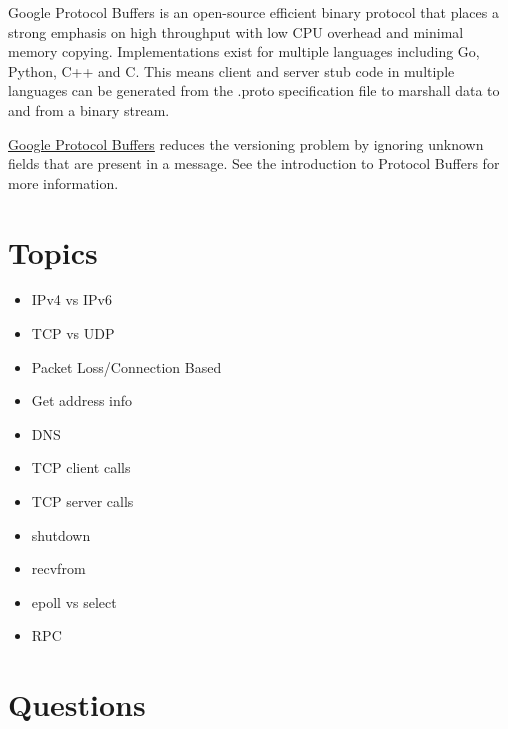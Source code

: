 Google Protocol Buffers is an open-source efficient binary protocol that
places a strong emphasis on high throughput with low CPU overhead and
minimal memory copying. Implementations exist for multiple languages
including Go, Python, C++ and C. This means client and server stub code
in multiple languages can be generated from the .proto specification
file to marshall data to and from a binary stream.

\href{https://developers.google.com/protocol-buffers/docs/overview}{Google
Protocol Buffers} reduces the versioning problem by ignoring unknown
fields that are present in a message. See the introduction to Protocol
Buffers for more information.

\section{Topics}\label{topics}

\begin{itemize}
\tightlist
\item
  IPv4 vs IPv6
\item
  TCP vs UDP
\item
  Packet Loss/Connection Based
\item
  Get address info
\item
  DNS
\item
  TCP client calls
\item
  TCP server calls
\item
  shutdown
\item
  recvfrom
\item
  epoll vs select
\item
  RPC
\end{itemize}

\section{Questions}\label{questions}

